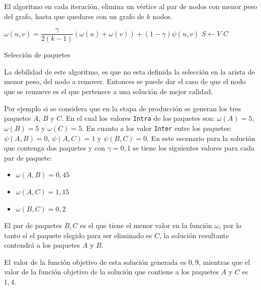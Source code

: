 El algoritmo en cada iteración, elimina un vértice al par de nodos con menor peso del grafo, hasta que quedarse con un grafo de $k$ nodos.

\begin{center}
	\begin{algorithm}[H]
	\DontPrintSemicolon
	\SetAlgoLined
		$\omega(u,v) = \dfrac{\gamma}{2( k - 1)} (\omega(u) + \omega(v)) + (1 - \gamma)\psi(u,v)$\;
		$S \leftarrow V$\;
		\Return $C$\;
	\caption{Selección de paquetes}\label{alg:chooseBundles}
	\end{algorithm}
\end{center}


La debilidad de este algoritmo, es que no esta definida la selección en la arista de menor peso, del nodo a remover. Entonces se puede dar el caso de que el nodo que se remueve es el que pertenece a una solución de mejor calidad.

Por ejemplo si se considera que en la etapa de producción se generan los tres paquetes $A$, $B$ y $C$. En el cual los valores \texttt{Intra} de los paquetes son: $\omega(A) = 5$, $\omega(B) = 5$ y $\omega(C) = 5$. En cuanto a los valor \texttt{Inter} entre los paquetes:$\psi(A,B) = 0$, $\psi(A,C) = 1$ y $\psi(B,C) = 0$. En este escenario para la solución que contenga dos paquetes y con $\gamma=0,1$ se tiene los siguientes valores para cada par de paquete:
\begin{itemize}
	\item $\omega(A,B) = 0,45$
	\item $\omega(A,C) = 1,15$
	\item $\omega(B,C) = 0,2$
\end{itemize}
 
El par de paquetes $B, C$ es el que tiene el menor valor en la función $\omega$, por lo tanto sí el paquete elegido para ser eliminado es $C$, la solución resultante contendrá a los paquetes $A$ y $B$. 

El valor de la función objetivo de esta solución generada es $0,9$, mientras que el valor de la función objetivo de la solución que contiene a los paquetes $A$ y $C$ es $1,4$.

